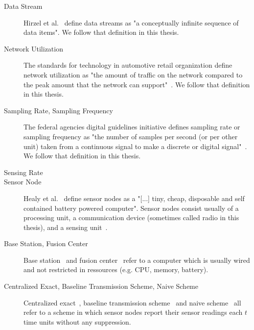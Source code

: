 \begin{description}

    \item[Data Stream]
        Hirzel et al.~\cite{hirzel2014catalog} define data streams as "a
        conceptually infinite sequence of data items". We follow that
        definition in this thesis.
    \item[Network Utilization]
        The standards for technology in automotive retail organization define
        network utilization as "the amount of traffic on the network compared
        to the peak amount that the network can support"~\cite{networkutil}. We
        follow that definition in this thesis.

    \item[Sampling Rate, Sampling Frequency]
        The federal agencies digital guidelines initiative defines sampling
        rate or sampling frequency as "the number of samples per second (or per
        other unit) taken from a continuous signal to make a discrete or
        digital signal"~\cite{samplingrate}. We follow that definition in this
        thesis.

    \item[Sensing Rate]
        

    \item[Sensor Node]
        Healy et al.~\cite{healy2008wireless} define sensor nodes as a "[...]
        tiny, cheap, disposable and self contained battery powered computer".
        Sensor nodes consist usually of a processing unit, a communication
        device (sometimes called radio in this thesis), and a sensing
        unit~\cite{akyildiz2002wireless}.

    \item[Base Station, Fusion Center]
        Base station~\cite{padhy2006utility} and fusion
        center~\cite{willett2004backcasting} refer to a computer which is
        usually wired and not restricted in ressources (e.g. CPU, memory,
        battery).
        

    \item[Centralized Exact, Baseline Transmission Scheme, Naive Scheme]
        Centralized exact~\cite{gedik2007asap}, baseline transmission
        scheme~\cite{luo2009compressive} and naive
        scheme~\cite{cheng2010efficient} all refer to a scheme in which sensor
        nodes report their sensor readings each $ t $ time units without any
        suppression. 
       

\end{description}
